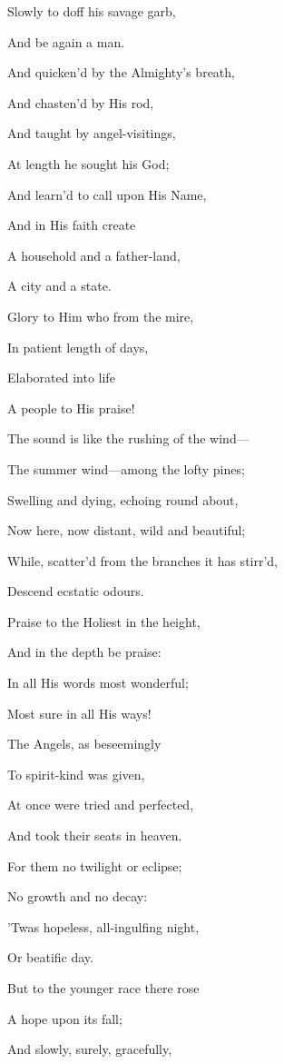 Slowly
to doff his savage garb,

And be again a man. 

And
quicken'd by the Almighty's breath,

And chasten'd by His rod,

And
taught by angel-visitings,

At length he sought his God;

And
learn'd to call upon His Name,

And in His faith create

A
household and a father-land,

A city and a state.

Glory to
Him who from the mire,

In patient length of days,

Elaborated into life

A people to His praise!


The sound is like the rushing of the wind—

The summer wind—among the lofty pines;

Swelling and dying, echoing round about,

Now here, now distant, wild and beautiful;

While, scatter'd from the branches it has stirr'd,

Descend ecstatic odours.


Praise to
the Holiest in the height,

And in the depth be praise:

In all
His words most wonderful;

Most sure in all His ways!

The
Angels, as beseemingly

To spirit-kind was given,

At once
were tried and perfected,

And took their seats in heaven.

For them
no twilight or eclipse;

No growth and no decay:

'Twas
hopeless, all-ingulfing night,

Or beatific day.

But to
the younger race there rose

A hope upon its fall;

And
slowly, surely, gracefully,


